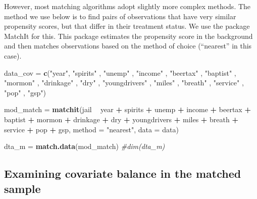 \documentclass[]{article}
\newenvironment{Shaded}{\begin{snugshade}}{\end{snugshade}}
\newcommand{\CommentTok}[1]{\textcolor[rgb]{0.56,0.35,0.01}{\textit{#1}}}
\newcommand{\DataTypeTok}[1]{\textcolor[rgb]{0.13,0.29,0.53}{#1}}
\newcommand{\KeywordTok}[1]{\textcolor[rgb]{0.13,0.29,0.53}{\textbf{#1}}}
\newcommand{\NormalTok}[1]{#1}
\newcommand{\OperatorTok}[1]{\textcolor[rgb]{0.81,0.36,0.00}{\textbf{#1}}}
\newcommand{\StringTok}[1]{\textcolor[rgb]{0.31,0.60,0.02}{#1}}
\begin{document}
However, most matching algorithms adopt slightly more complex methods. The method we use below is to find pairs of observations that have very similar propensity scores, but that differ in their treatment status. We use the package MatchIt for this. This package estimates the propensity score in the background and then matches observations based on the method of choice (``nearest'' in this case).

\begin{Shaded}
\begin{Highlighting}[]
\NormalTok{data_cov =}\StringTok{ }\KeywordTok{c}\NormalTok{(}\StringTok{"year"}\NormalTok{, }\StringTok{"spirits"}\NormalTok{ , }\StringTok{"unemp"}\NormalTok{ , }\StringTok{"income"}\NormalTok{ , }\StringTok{"beertax"}\NormalTok{ , }\StringTok{"baptist"}\NormalTok{ , }\StringTok{"mormon"}\NormalTok{ , }\StringTok{"drinkage"}\NormalTok{ , }\StringTok{"dry"}\NormalTok{ , }\StringTok{"youngdrivers"}\NormalTok{ , }\StringTok{"miles"}\NormalTok{ , }\StringTok{"breath"}\NormalTok{ , }\StringTok{"service"}\NormalTok{ , }\StringTok{"pop"}\NormalTok{ , }\StringTok{"gsp"}\NormalTok{)}

\NormalTok{mod_match =}\StringTok{ }\KeywordTok{matchit}\NormalTok{(jail }\OperatorTok{~}\StringTok{ }\NormalTok{year }\OperatorTok{+}\StringTok{ }\NormalTok{spirits }\OperatorTok{+}\StringTok{ }\NormalTok{unemp }\OperatorTok{+}\StringTok{ }\NormalTok{income }\OperatorTok{+}\StringTok{ }\NormalTok{beertax }\OperatorTok{+}\StringTok{ }\NormalTok{baptist }\OperatorTok{+}\StringTok{ }\NormalTok{mormon }\OperatorTok{+}\StringTok{ }\NormalTok{drinkage }\OperatorTok{+}\StringTok{ }\NormalTok{dry }\OperatorTok{+}\StringTok{ }\NormalTok{youngdrivers }\OperatorTok{+}\StringTok{ }\NormalTok{miles }\OperatorTok{+}\StringTok{ }\NormalTok{breath }\OperatorTok{+}\StringTok{ }\NormalTok{service }\OperatorTok{+}\StringTok{ }\NormalTok{pop }\OperatorTok{+}\StringTok{ }\NormalTok{gsp, }\DataTypeTok{method =} \StringTok{"nearest"}\NormalTok{, }\DataTypeTok{data =}\NormalTok{ data)}

\NormalTok{dta_m =}\StringTok{ }\KeywordTok{match.data}\NormalTok{(mod_match)}
\CommentTok{#dim(dta_m)}
\end{Highlighting}
\end{Shaded}

\hypertarget{examining-covariate-balance-in-the-matched-sample}{%
\subsection{Examining covariate balance in the matched sample}\label{examining-covariate-balance-in-the-matched-sample}}
\end{document}
